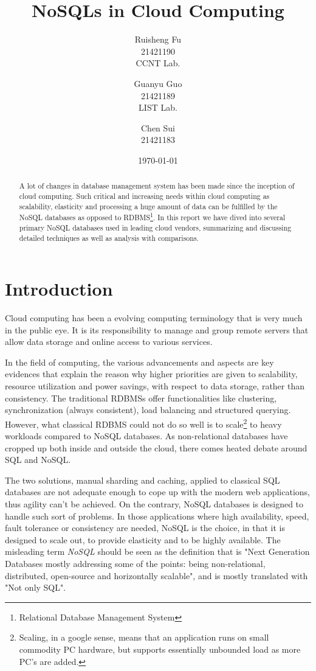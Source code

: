 \documentclass[12pt,letter]{article}
\author{Ruisheng Fu\\21421190\\CCNT Lab.
\and
Guanyu Guo\\21421189\\LIST Lab.
\and
Chen Sui\\21421183}
\title{NoSQLs in Cloud Computing}
\date{\today}
\begin{document}
\maketitle
\tableofcontents

\begin{abstract}
A lot of changes in database management system has been made since the inception of cloud computing. Such critical and increasing needs within cloud computing as scalability, elasticity and  processing a huge amount of data can be fulfilled by the NoSQL databases as opposed to RDBMS\footnote{Relational Database Management System}. In this report we have dived into several primary NoSQL databases used in leading cloud vendors, summarizing and discussing detailed techniques as well as analysis with comparisons.
\end{abstract}

\section{Introduction}
Cloud computing has been a evolving computing terminology that is very much in the public eye. It is its responsibility to manage and group remote servers that allow data storage and online access to various services. 

In the field of computing, the various advancements and aspects are key evidences that explain the reason why higher priorities are given to scalability, resource utilization and power savings, with respect to data storage, rather than consistency. The traditional RDBMSs offer functionalities like clustering, synchronization (always consistent), load balancing and structured querying. However, what classical RDBMS could not do so well is to scale\footnote{Scaling, in a google sense, means that an application runs on small commodity PC hardware, but supports essentially unbounded load as more PC’s are added. } to heavy workloads compared to NoSQL databases. As non-relational databases have cropped up both inside and outside the cloud, there comes heated debate around SQL and NoSQL.\citep{Bain2009}

The two solutions, manual sharding and caching, applied to classical SQL databases are not adequate enough to cope up with the modern web applications, thus agility can't be achieved. On the contrary, NoSQL databases is designed to handle such sort of problems. In those applications where high availability, speed, fault tolerance or consistency are needed, NoSQL is the choice, in that it is designed to scale out, to provide elasticity and to be highly available. The misleading term \textit{NoSQL} should be seen as the definition\citep{Unknown2012} that is "Next Generation Databases mostly addressing some of the points: being non-relational, distributed, open-source and horizontally scalable", and is mostly translated with "Not only SQL".
\end{document}

